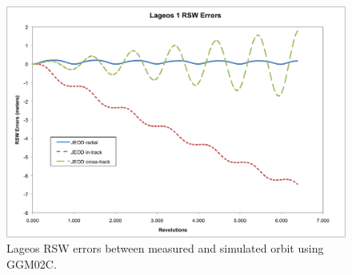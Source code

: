 \begin{description}
\begin{figure}
\begin{center}
\includegraphics [width=7.0in]{figs/lageos/lageos_err.png}
\end{center}
\caption{Lageos RSW errors between measured and simulated orbit using GGM02C.}
\label{fig:4}
\end{figure}

\clearpage
\pagebreak

\end{description}

\newpage
